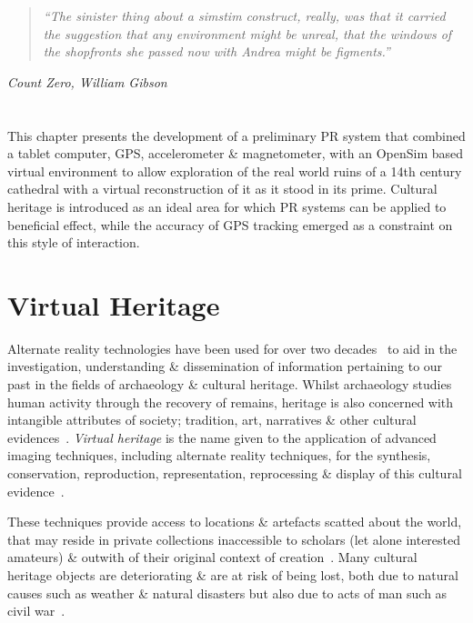 \begin{quote}
	\textit{``The sinister thing about a simstim construct, really, was that it carried the suggestion that any environment might be unreal, that the windows of the shopfronts she passed now with Andrea might be figments.''}
\end{quote}
\hfill \textit{Count Zero, William Gibson}
\\
\\
\\


This chapter presents the development of a preliminary PR system that combined a tablet computer, GPS, accelerometer \& magnetometer, with an OpenSim based virtual environment to allow exploration of the real world ruins of a 14th century cathedral with a virtual reconstruction of it as it stood in its prime. Cultural heritage is introduced as an ideal area for which PR systems can be applied to beneficial effect, while the accuracy of GPS tracking emerged as a constraint on this style of interaction.


\section{Virtual Heritage}

Alternate reality technologies have been used for over two decades~\cite{Roussou2002} to aid in the investigation, understanding \& dissemination of information pertaining to our past in the fields of archaeology \& cultural heritage. Whilst archaeology studies human activity through the recovery of remains, heritage is also concerned with intangible attributes of society; tradition, art, narratives \& other cultural evidences~\cite{Roussou2002}. \textit{Virtual heritage} is the name given to the application of advanced imaging techniques, including alternate reality techniques, for the synthesis, conservation, reproduction, representation, reprocessing \& display of this cultural evidence~\cite{roussou:photorealism}.

These techniques provide access to locations \& artefacts scatted about the world, that may reside in private collections inaccessible to scholars (let alone interested amateurs) \& outwith of their original context of creation~\cite{griffin:recovering}. Many cultural heritage objects are deteriorating \& are at risk of being lost, both due to natural causes such as weather \& natural disasters but also due to acts of man such as civil war~\cite{Ikeuchi2003}.

